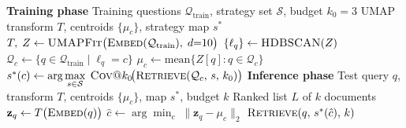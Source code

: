 \begin{algorithm}[htbp]
\caption{Task-Conditioned Indexing: Training \& Inference}
\label{alg:tc-inference}
\small
\begin{algorithmic}[1]
\Statex \textbf{Training phase}
\Require Training questions $\mathcal{Q}_{\text{train}}$, strategy set $\mathcal{S}$,
         budget $k_0{=}3$
\Ensure  UMAP transform $T$, centroids $\{\mu_c\}$, strategy map $s^{*}$
\State $T,\; Z \leftarrow \textsc{UMAPFit}\bigl(\textsc{Embed}(\mathcal{Q}_{\text{train}}),\; d{=}10\bigr)$
\State $\{\ell_q\} \leftarrow \textsc{HDBSCAN}(Z)$
    \State $\mathcal{Q}_c \leftarrow \{q \in \mathcal{Q}_{\text{train}} \mid \ell_q = c\}$
    \State $\mu_c \leftarrow \mathrm{mean}\{Z[q] : q \in \mathcal{Q}_c\}$
    \State $s^{*}(c) \leftarrow \displaystyle\arg\max_{s \in \mathcal{S}}\;
            \textsc{Cov@}k_0\!\bigl(\textsc{Retrieve}(\mathcal{Q}_c,\, s,\, k_0)\bigr)$
\EndFor
\Statex
\Statex \textbf{Inference phase}
\Require Test query $q$, transform $T$, centroids $\{\mu_c\}$, map $s^{*}$, budget $k$
\Ensure  Ranked list $L$ of $k$ documents
\State $\mathbf{z}_q \leftarrow T\bigl(\textsc{Embed}(q)\bigr)$
\State $\hat{c} \leftarrow \arg\min_{c}\; \|\mathbf{z}_q - \mu_c\|_2$
\State \Return $\textsc{Retrieve}(q,\, s^{*}(\hat{c}),\, k)$
\end{algorithmic}
\end{algorithm}



